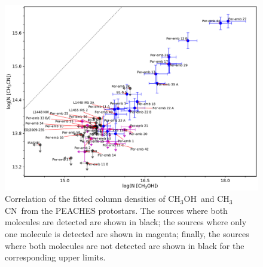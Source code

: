 \documentclass[twocolumn]{aastex62}
\newcommand{\methanol}{\mbox{CH$_{3}$OH}}
\newcommand{\methylcyanide}{\mbox{CH$_{3}$CN}}
\newcommand{\cch}{\mbox{C$_2$H}}
\begin{document}

\begin{figure}[htbp!]
  \centering
  \includegraphics[width=\textwidth]{Ncol_ch3oh_ch3cn.pdf}
  \caption{Correlation of the fitted column densities of \methanol\ and \methylcyanide\ from the PEACHES protostars.  The sources where both molecules are detected are shown in black; the sources where only one molecule is detected are shown in magenta; finally, the sources where both molecules are not detected are shown in black for the corresponding upper limits.}
  \label{fig:ch3oh_ch3cn}
\end{figure}
\end{document}
